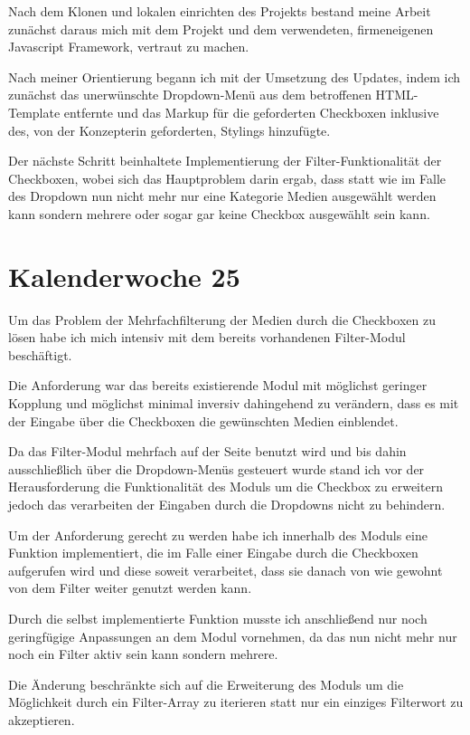 \documentclass[11pt]{article} %
\begin{document}
Nach dem Klonen und lokalen einrichten des Projekts bestand meine Arbeit zunächst daraus mich mit dem Projekt und dem verwendeten, firmeneigenen Javascript Framework, vertraut zu machen.

Nach meiner Orientierung begann ich mit der Umsetzung des Updates, indem ich zunächst das unerwünschte Dropdown-Menü aus dem betroffenen HTML-Template entfernte und das Markup für die geforderten Checkboxen inklusive des, von der Konzepterin geforderten, Stylings hinzufügte.

Der nächste Schritt beinhaltete Implementierung der Filter-Funktionalität der Checkboxen, wobei sich das Hauptproblem darin ergab, dass statt wie im Falle des Dropdown nun nicht mehr nur eine Kategorie Medien ausgewählt werden kann sondern mehrere oder sogar gar keine Checkbox ausgewählt sein kann.

\section{Kalenderwoche 25} \label{sec:kw25}

Um das Problem der Mehrfachfilterung der Medien durch die Checkboxen zu lösen habe ich mich intensiv mit dem bereits vorhandenen Filter-Modul beschäftigt.

Die Anforderung war das bereits existierende Modul mit möglichst geringer Kopplung und möglichst minimal inversiv dahingehend zu verändern, dass es mit der Eingabe über die Checkboxen die gewünschten Medien einblendet. 

Da das Filter-Modul mehrfach auf der Seite benutzt wird und bis dahin ausschließlich über die Dropdown-Menüs gesteuert wurde stand ich vor der Herausforderung die Funktionalität des Moduls um die Checkbox zu erweitern jedoch das verarbeiten der Eingaben durch die Dropdowns nicht zu behindern.

Um der Anforderung gerecht zu werden habe ich innerhalb des Moduls eine Funktion implementiert, die im Falle einer Eingabe durch die Checkboxen aufgerufen wird und diese soweit verarbeitet, dass sie danach von wie gewohnt von dem Filter weiter genutzt werden kann.

Durch die selbst implementierte Funktion musste ich anschließend nur noch geringfügige Anpassungen an dem Modul vornehmen, da das nun nicht mehr nur noch ein Filter aktiv sein kann sondern mehrere.

Die Änderung beschränkte sich auf die Erweiterung des Moduls um die Möglichkeit durch ein Filter-Array zu iterieren statt nur ein einziges Filterwort zu akzeptieren. 
\end{document}

